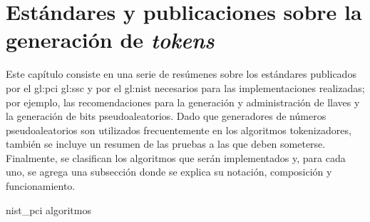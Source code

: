%
%
%

\chapter{Estándares y publicaciones sobre la generación de \textit{tokens}}
\label{sec:generacion_de_tokens}

Este capítulo consiste en una serie de resúmenes sobre los estándares publicados
por el \gls{gl:pci} \gls{gl:ssc} y por el \gls{gl:nist} necesarios para las
implementaciones realizadas; por ejemplo, las recomendaciones para la
generación y administración de llaves y la generación de bits pseudoaleatorios.
Dado que generadores de números pseudoaleatorios son utilizados frecuentemente
en los algoritmos tokenizadores, también se incluye un resumen de las pruebas a
las que deben someterse. Finalmente, se clasifican los algoritmos que serán
implementados y, para cada uno, se agrega una subsección donde se explica su
notación, composición y funcionamiento.

{nist_pci}
{algoritmos}
